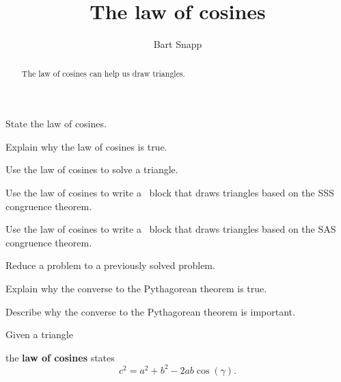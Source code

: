 \documentclass[noauthor,nooutcomes,handout]{ximera}
\title{The law of cosines}
\author{Bart Snapp}
\begin{document}
\begin{abstract}
   The law of cosines can help us draw triangles.
\end{abstract}
\maketitle

\begin{listOutcomes}
\item State the law of cosines.
\item Explain why the law of cosines is true.
\item Use the law of cosines to solve a triangle.
\item Use the law of cosines to write a \snap\ block that draws triangles
  based on the SSS congruence theorem.
\item Use the law of cosines to write a \snap\ block that draws triangles
  based on the SAS congruence theorem.
\item Reduce a problem to a previously solved problem.
\item Explain why the converse to the Pythagorean theorem is true.
\item Describe why the converse to the Pythagorean theorem is
  important.
\end{listOutcomes}

Given a triangle
\begin{center}
\end{center}
the \textbf{law of cosines} states
\[
c^2 = a^2 + b^2 - 2ab\cos(\gamma).
\]
\mynewpage
\end{document}
